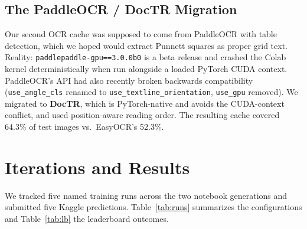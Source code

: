 \documentclass[11pt]{article}
\begin{document}
\subsection{The PaddleOCR / DocTR Migration}
Our second OCR cache was supposed to come from PaddleOCR with table detection, which we hoped would extract Punnett squares as proper grid text. Reality: \texttt{paddlepaddle-gpu==3.0.0b0} is a beta release and crashed the Colab kernel deterministically when run alongside a loaded PyTorch CUDA context. PaddleOCR's API had also recently broken backwards compatibility (\texttt{use\_angle\_cls} renamed to \texttt{use\_textline\_orientation}, \texttt{use\_gpu} removed). We migrated to \textbf{DocTR}, which is PyTorch-native and avoids the CUDA-context conflict, and used position-aware reading order. The resulting cache covered 64.3\% of test images vs.\ EasyOCR's 52.3\%.

\section{Iterations and Results}
\label{sec:experiments}

We tracked five named training runs across the two notebook generations and submitted five Kaggle predictions. Table~\ref{tab:runs} summarizes the configurations and Table~\ref{tab:lb} the leaderboard outcomes.

\begin{table}[H]
  \centering
  \caption{Training-run configurations. ``Val Acc'' is each run's monitor-set accuracy. For Runs A, B, C this is the full 1{,}048-row validation set. For Runs E, F the monitor is each run's own 420-row held-out subset (driven by its seed) since the rest of validation went into training; cross-run numerical comparison there is misleading.}
  \label{tab:runs}
\end{table}
\end{document}
